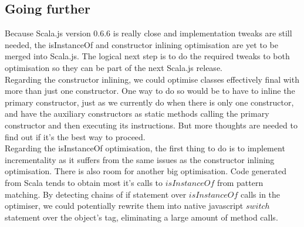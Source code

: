 \subsection{Going further}
Because Scala.js version 0.6.6 is really close and implementation
tweaks are still needed, the isInstanceOf and constructor inlining optimisation
are yet to be merged into Scala.js. The logical next step is to do the required
tweaks to both optimisation so they can be part of the next Scala.js release.\\
Regarding the constructor inlining, we could optimise classes effectively
final with more than just one constructor. One way to do so would be to have
to inline the primary constructor, just as we currently do when there is
only one constructor, and have the auxiliary constructors as static methods
calling the primary constructor and then executing its instructions. But more
thoughts are needed to find out if it's the best way to proceed.\\
Regarding the isInstanceOf optimisation, the first thing to do is to implement
incrementality as it suffers from the same issues as the constructor inlining
optimisation. There is also room for another big optimisation. Code generated
from Scala tends to obtain most it's calls to $isInstanceOf$ from pattern
matching. By detecting chains of if statement over $isInstanceOf$ calls in the
optimiser, we could potentially rewrite them into native javascript $switch$
statement over the object's tag, eliminating a large amount of method calls.